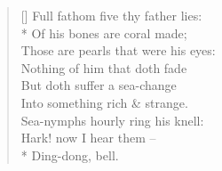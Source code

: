 \documentclass[MAIN]{subfiles}
\begin{document}
\settowidth{\versewidth}{Full fathom five thy father lies:}
\begin{verse}[\versewidth]
Full fathom five thy father lies:\\*
\vin Of his bones are coral made;\\
Those are pearls that were his eyes:\\
\vin Nothing of him that doth fade\\
But doth suffer a sea-change\\
Into something rich \& strange.\\
Sea-nymphs hourly ring his knell:\\
Hark! now I hear them --\\*
\vin \vin Ding-dong, bell.
\end{verse}
\end{document}
